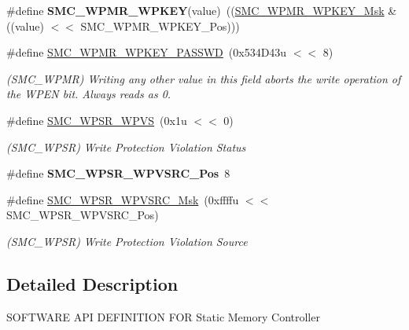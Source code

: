 \begin{DoxyCompactItemize}
\mbox{\label{group__SAMS70__SMC_gad1c580c59fc56bf766d0ef3484f44f44}} 
\#define {\bfseries S\+M\+C\+\_\+\+W\+P\+M\+R\+\_\+\+W\+P\+K\+EY}(value)~((\mbox{\hyperlink{group__SAMV71__SMC_ga588e57ce3327f3036091fae414adc054}{S\+M\+C\+\_\+\+W\+P\+M\+R\+\_\+\+W\+P\+K\+E\+Y\+\_\+\+Msk}} \& ((value) $<$$<$ S\+M\+C\+\_\+\+W\+P\+M\+R\+\_\+\+W\+P\+K\+E\+Y\+\_\+\+Pos)))
\item 
\mbox{\label{group__SAMS70__SMC_ga704d5be56badbe9b71f14e9604fdabc7}} 
\#define \mbox{\hyperlink{group__SAMS70__SMC_ga704d5be56badbe9b71f14e9604fdabc7}{S\+M\+C\+\_\+\+W\+P\+M\+R\+\_\+\+W\+P\+K\+E\+Y\+\_\+\+P\+A\+S\+S\+WD}}~(0x534\+D43u $<$$<$ 8)
\begin{DoxyCompactList}\small\item\em (S\+M\+C\+\_\+\+W\+P\+MR) Writing any other value in this field aborts the write operation of the W\+P\+EN bit. Always reads as 0. \end{DoxyCompactList}\item 
\mbox{\label{group__SAMS70__SMC_ga03b1d62fbf36357cc008315104a140c4}} 
\#define \mbox{\hyperlink{group__SAMS70__SMC_ga03b1d62fbf36357cc008315104a140c4}{S\+M\+C\+\_\+\+W\+P\+S\+R\+\_\+\+W\+P\+VS}}~(0x1u $<$$<$ 0)
\begin{DoxyCompactList}\small\item\em (S\+M\+C\+\_\+\+W\+P\+SR) Write Protection Violation Status \end{DoxyCompactList}\item 
\mbox{\label{group__SAMS70__SMC_ga82f6511278bd924f5dece5a562e8ec26}} 
\#define {\bfseries S\+M\+C\+\_\+\+W\+P\+S\+R\+\_\+\+W\+P\+V\+S\+R\+C\+\_\+\+Pos}~8
\item 
\mbox{\label{group__SAMS70__SMC_ga48efdac8353b5b525f55005c016e8548}} 
\#define \mbox{\hyperlink{group__SAMS70__SMC_ga48efdac8353b5b525f55005c016e8548}{S\+M\+C\+\_\+\+W\+P\+S\+R\+\_\+\+W\+P\+V\+S\+R\+C\+\_\+\+Msk}}~(0xffffu $<$$<$ S\+M\+C\+\_\+\+W\+P\+S\+R\+\_\+\+W\+P\+V\+S\+R\+C\+\_\+\+Pos)
\begin{DoxyCompactList}\small\item\em (S\+M\+C\+\_\+\+W\+P\+SR) Write Protection Violation Source \end{DoxyCompactList}\end{DoxyCompactItemize}


\subsection{Detailed Description}
S\+O\+F\+T\+W\+A\+RE A\+PI D\+E\+F\+I\+N\+I\+T\+I\+ON F\+OR Static Memory Controller 